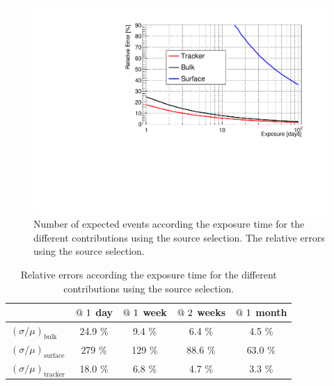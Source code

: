 \documentclass[main.tex]{subfiles}
\begin{document}
\begin{figure}[h!]
\begin{center}
\includegraphics[scale=0.6]{pictures/Chap5/n_source_selection_last_results.pdf}
\caption{Number of expected events according the exposure time for the different contributions using the source selection. The relative errors using the source selection.}
\label{picture_relative_error_source_selection}
\end{center}
\end{figure}


\begin{table}[h!]
\begin{center}
\begin{tabular}{l|c|c|c|c}
       & $\symbol{64}~1$ day  & $\symbol{64}~1$ week  & $\symbol{64}~2$ weeks & $\symbol{64}~1$ month  \\
\hline
$(\sigma / \mu)_{\text{bulk}}$    & 24.9 \% & 9.4  \% & 6.4  \% & 4.5  \% \\
$(\sigma / \mu)_{\text{surface}}$ & 279  \% & 129  \% & 88.6 \% & 63.0 \% \\
$(\sigma / \mu)_{\text{tracker}}$ & 18.0 \% & 6.8  \% & 4.7  \% & 3.3  \% \\
\hline
\end{tabular}
\end{center}
\caption{Relative errors according the exposure time for the different contributions using the source selection.}
\label{table_relative_error_source_selection}
\end{table}
\end{document}
